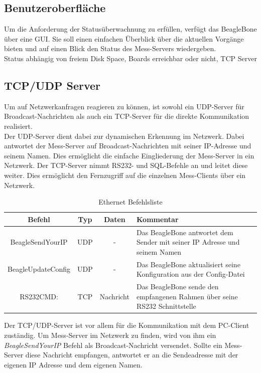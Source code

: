  
\newpage
\subsection{Benutzeroberfläche}
Um die Anforderung der Statusüberwachnung zu erfüllen, verfügt das BeagleBone über eine \ac{GUI}. Sie soll einen einfachen Überblick über die aktuellen Vorgänge bieten und auf einen Blick den Status des Mess-Servers wiedergeben.\\

Status abhängig von freiem Disk Space, Boards erreichbar oder nicht, TCP Server


\newpage
\subsection{TCP/UDP Server}
\label{section_TCPUDPServer}
Um auf Netzwerkanfragen reagieren zu können, ist sowohl ein UDP-Server für Broadcast-Nachrichten als auch ein TCP-Server für die direkte Kommunikation realisiert.\\
Der UDP-Server dient dabei zur dynamischen Erkennung im Netzwerk. Dabei antwortet der Mess-Server auf Broadcast-Nachrichten mit seiner IP-Adresse und seinem Namen. Dies ermöglicht die einfache Eingliederung der Mess-Server in ein Netzwerk.
Der TCP-Server nimmt RS232- und SQL-Befehle an und leitet diese weiter. Dies ermöglicht den Fernzugriff auf die einzelnen Mess-Clients über ein Netzwerk.\\

\begin{table}[H]
\begin{center}
\begin{tabularx}{\textwidth}{|c|c|c|X|}\hline 
 Befehl & Typ & Daten & Kommentar \\ \hline
 BeagleSendYourIP & UDP & - & Das BeagleBone antwortet dem Sender mit seiner IP Adresse und seinem Namen  \\ \hline
 BeagleUpdateConfig & UDP & - & Das BeagleBone aktualisiert seine Konfiguration aus der Config-Datei \\ \hline
 RS232CMD: & TCP & Nachricht & Das BeagleBone sende den empfangenen Rahmen über seine RS232 Schnittstelle \\ \hline
\end{tabularx}
\caption{Ethernet Befehlsliste}
\label{table_EthernetCommands}
\end{center}
\end{table}

Der TCP/UDP-Server ist vor allem für die Kommunikation mit dem PC-Client zuständig. Um Mess-Server im Netzwerk zu finden, wird von ihm ein \textit{BeagleSendYourIP} Befehl als Broadcast-Nachricht versendet. Sollte ein Mess-Server diese Nachricht empfangen, antwortet er an die Sendeadresse mit der eigenen IP Adresse und dem eigenen Namen.\ 

